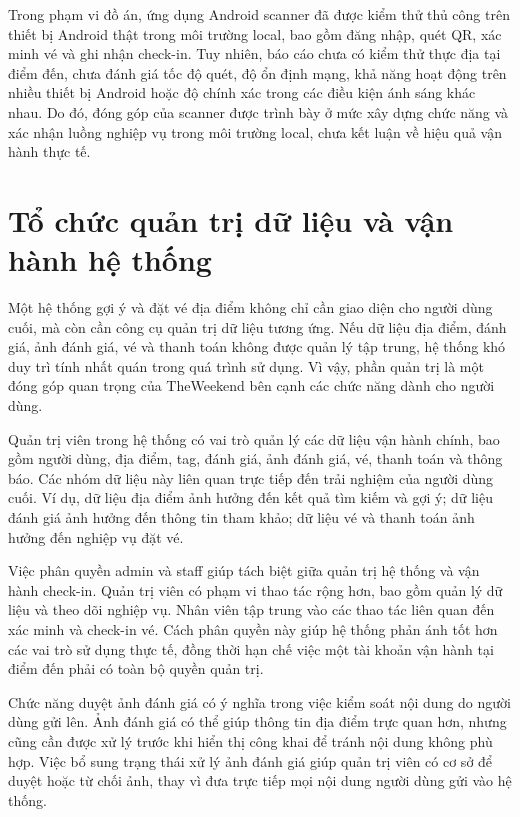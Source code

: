 \documentclass[../DoAn.tex]{subfiles}
\begin{document}
Trong phạm vi đồ án, ứng dụng Android scanner đã được kiểm thử thủ công trên thiết bị Android thật trong môi trường local, bao gồm đăng nhập, quét QR, xác minh vé và ghi nhận check-in. Tuy nhiên, báo cáo chưa có kiểm thử thực địa tại điểm đến, chưa đánh giá tốc độ quét, độ ổn định mạng, khả năng hoạt động trên nhiều thiết bị Android hoặc độ chính xác trong các điều kiện ánh sáng khác nhau. Do đó, đóng góp của scanner được trình bày ở mức xây dựng chức năng và xác nhận luồng nghiệp vụ trong môi trường local, chưa kết luận về hiệu quả vận hành thực tế.

\section{Tổ chức quản trị dữ liệu và vận hành hệ thống}

Một hệ thống gợi ý và đặt vé địa điểm không chỉ cần giao diện cho người dùng cuối, mà còn cần công cụ quản trị dữ liệu tương ứng. Nếu dữ liệu địa điểm, đánh giá, ảnh đánh giá, vé và thanh toán không được quản lý tập trung, hệ thống khó duy trì tính nhất quán trong quá trình sử dụng. Vì vậy, phần quản trị là một đóng góp quan trọng của TheWeekend bên cạnh các chức năng dành cho người dùng.

Quản trị viên trong hệ thống có vai trò quản lý các dữ liệu vận hành chính, bao gồm người dùng, địa điểm, tag, đánh giá, ảnh đánh giá, vé, thanh toán và thông báo. Các nhóm dữ liệu này liên quan trực tiếp đến trải nghiệm của người dùng cuối. Ví dụ, dữ liệu địa điểm ảnh hưởng đến kết quả tìm kiếm và gợi ý; dữ liệu đánh giá ảnh hưởng đến thông tin tham khảo; dữ liệu vé và thanh toán ảnh hưởng đến nghiệp vụ đặt vé.

Việc phân quyền admin và staff giúp tách biệt giữa quản trị hệ thống và vận hành check-in. Quản trị viên có phạm vi thao tác rộng hơn, bao gồm quản lý dữ liệu và theo dõi nghiệp vụ. Nhân viên tập trung vào các thao tác liên quan đến xác minh và check-in vé. Cách phân quyền này giúp hệ thống phản ánh tốt hơn các vai trò sử dụng thực tế, đồng thời hạn chế việc một tài khoản vận hành tại điểm đến phải có toàn bộ quyền quản trị.

Chức năng duyệt ảnh đánh giá có ý nghĩa trong việc kiểm soát nội dung do người dùng gửi lên. Ảnh đánh giá có thể giúp thông tin địa điểm trực quan hơn, nhưng cũng cần được xử lý trước khi hiển thị công khai để tránh nội dung không phù hợp. Việc bổ sung trạng thái xử lý ảnh đánh giá giúp quản trị viên có cơ sở để duyệt hoặc từ chối ảnh, thay vì đưa trực tiếp mọi nội dung người dùng gửi vào hệ thống.
\end{document}
